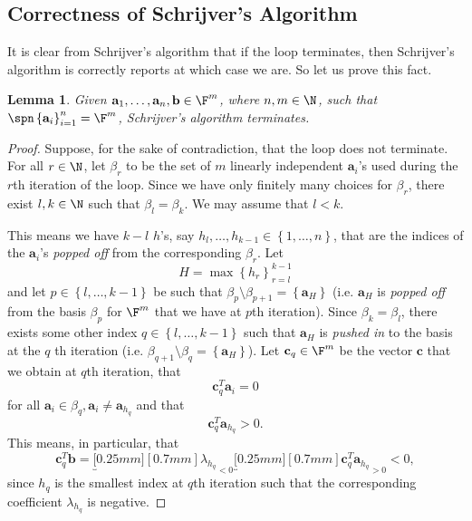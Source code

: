 \documentclass{article}
\newtheorem{lemma}[theorem]{Lemma}
\renewcommand{\underbrace}{\underbracket[0.25mm][0.7mm]}
\renewcommand{\vec}{\mathbf}
\begin{document}
\subsection{Correctness of Schrijver's Algorithm}

It is clear from Schrijver's algorithm that if the loop terminates, then Schrijver's algorithm is correctly reports at which case we are. So let us prove this fact.
\begin{lemma}
    Given $\vec{a}_1,\ldots,\vec{a}_n,\vec{b}\in\F^m$, where $n,m\in\N$, such that $\spn\left\lbrace \vec{a}_i \right\rbrace ^n_{i=1}=\F^m$, Schrijver's algorithm terminates.
\end{lemma}

\begin{proof}
    \cite{TLIP} Suppose, for the sake of contradiction, that the loop does not terminate. For all $r\in\N$, let $\beta_r$ to be the set of $m$ linearly independent $\vec{a}_i$'s used during the $r$th iteration of the loop. Since we have only finitely many choices for $\beta_r$, there exist $l,k\in\N$ such that $\beta_l=\beta_k$. We may assume that $l<k$.

    This means we have $k-l$ $h$'s, say $h_l,\ldots,h_{k-1}\in\left\lbrace 1,\ldots,n \right\rbrace$, that are the indices of the $\vec{a}_i$'s \textit{popped off} from the corresponding $\beta_r$. Let
    \begin{equation*}
        H = \max\left\lbrace h_r \right\rbrace^{k-1}_{r=l}
    \end{equation*}
    and let $p\in\left\lbrace l,\ldots,k-1 \right\rbrace$ be such that $\beta_p\setminus\beta_{p+1}=\left\lbrace \vec{a}_H \right\rbrace$ (i.e. $\vec{a}_H$ is \textit{popped off} from the basis $\beta_p$ for $\F^m$ that we have at $p$th iteration). Since $\beta_k=\beta_l$, there exists some other index $q\in\left\lbrace l,\ldots,k-1 \right\rbrace$ such that $\vec{a}_H$ is \textit{pushed in} to the basis at the $q$ th iteration (i.e. $\beta_{q+1}\setminus\beta_q=\left\lbrace \vec{a}_H \right\rbrace$). Let $\vec{c}_q\in\F^m$ be the vector $\vec{c}$ that we obtain at $q$th iteration, that
    \begin{equation*}
        \vec{c}_q^{T} \vec{a}_i = 0
    \end{equation*}
    for all $\vec{a}_i\in\beta_q, \vec{a}_i\neq \vec{a}_{h_q}$ and that
    \begin{equation*}
        \vec{c}_q^{T} \vec{a}_{h_q} > 0.
    \end{equation*}
    This means, in particular, that
    \begin{equation}
        \vec{c}_q^{T} \vec{b} = \underbrace{\lambda_{h_q}}_{<0}\underbrace{\vec{c}_q^{T} \vec{a}_{h_q}}_{>0} < 0,
    \end{equation}
    since $h_q$ is the smallest index at $q$th iteration such that the corresponding coefficient $\lambda_{h_q}$ is negative.


\end{proof}
\end{document}

